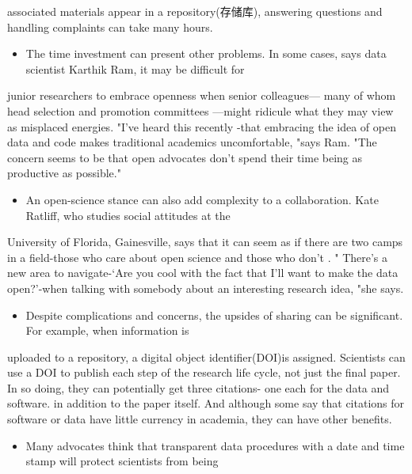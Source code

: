 \documentclass[UTF8,11pt]{ctexart}
\begin{document}
associated materials appear in a repository(存储库), answering questions and handling complaints can take many hours.


\begin{itemize}[leftmargin=2em,itemsep=.2em,topsep=.4em]\item[J.] The time investment can present other problems. In some cases, says data scientist Karthik Ram, it may be difficult for
\end{itemize}

junior researchers to embrace openness when senior colleagues— many of whom head selection and promotion committees —might ridicule what they may view as misplaced energies. "I've heard this recently -that embracing the idea of open data and code makes traditional academics uncomfortable, "says Ram. "The concern seems to be that open advocates don't spend their time being as productive as possible."


\begin{itemize}[leftmargin=2em,itemsep=.2em,topsep=.4em]\item[K.] An open-science stance can also add complexity to a collaboration. Kate Ratliff, who studies social attitudes at the
\end{itemize}

University of Florida, Gainesville, says that it can seem as if there are two camps in a field-those who care about open science and those who don't . " There’s a new area to navigate-‘Are you cool with the fact that I'll want to make the data open?'-when talking with somebody about an interesting research idea, "she says.


\begin{itemize}[leftmargin=2em,itemsep=.2em,topsep=.4em]\item[L.] Despite complications and concerns, the upsides of sharing can be significant. For example, when information is
\end{itemize}

uploaded to a repository, a digital object identifier(DOI)is assigned. Scientists can use a DOI to publish each step of the research life cycle, not just the final paper. In so doing, they can potentially get three citations- one each for the data and software. in addition to the paper itself. And although some say that citations for software or data have little currency in academia, they can have other benefits.


\begin{itemize}[leftmargin=2em,itemsep=.2em,topsep=.4em]\item[M.] Many advocates think that transparent data procedures with a date and time stamp will protect scientists from being
\end{itemize}
\end{document}
